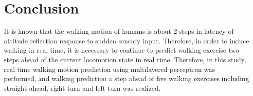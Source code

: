 \documentclass{sigchi}
\begin{document}
%
%
%
%
%
\balance{}


%
%
\section{Conclusion}%
It is known that the walking motion of humans is about 2 steps in latency of attitude reflection response to sudden sensory input. Therefore, in order to induce walking in real time, it is necessary to continue to predict walking exercise two steps ahead of the current locomotion state in real time. Therefore, in this study, real time walking motion prediction using multilayered perceptron was performed, and walking prediction a step ahead of five walking exercises including straight ahead, right turn and left turn was realized.
\end{document}
